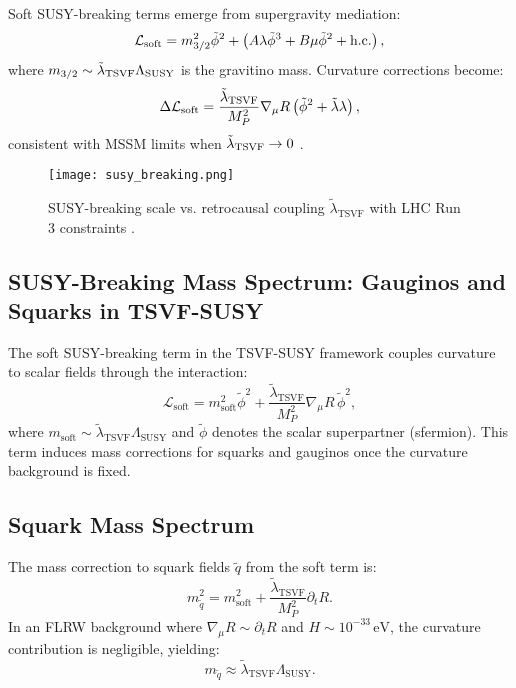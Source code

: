 \documentclass[twocolumn,superscriptaddress,floatfix]{revtex4-2}
\begin{document}
Soft SUSY-breaking terms emerge from supergravity mediation:
\begin{equation}
\mathcal{L}_{\rm soft} = m_{3/2}^2 \tilde{\phi}^2 + \left( A\lambda \tilde{\phi}^3 + B\mu \tilde{\phi}^2 + \text{h.c.} \right),
\label{eq:soft_breaking}
\end{equation}
where $m_{3/2} \sim \tilde{\lambda}_{\rm TSVF} \Lambda_{\rm SUSY}$ is the gravitino mass. Curvature corrections become:
\begin{equation}
\Delta\mathcal{L}_{\rm soft} = \frac{\tilde{\lambda}_{\rm TSVF}}{M_P^2} \nabla_\mu R \left( \tilde{\phi}^2 + \tilde{\lambda}\lambda \right),
\label{eq:curvature_correction}
\end{equation}
consistent with MSSM limits when $\tilde{\lambda}_{\rm TSVF} \to 0$ \cite{Martin:1997, Nilles:1984}.

\begin{figure}[htbp]
\centering
\texttt{[image: susy\_breaking.png]}
\caption{SUSY-breaking scale vs. retrocausal coupling $\tilde{\lambda}_{\text{TSVF}}$ with LHC Run 3 constraints \cite{CMS2023}.}
\label{fig:susy_breaking}
\end{figure}

\subsection{SUSY-Breaking Mass Spectrum: Gauginos and Squarks in TSVF-SUSY}
\label{subsec:susy_mass_spectrum}

The soft SUSY-breaking term in the TSVF-SUSY framework couples curvature to scalar fields through the interaction:
\begin{equation}
\mathcal{L}_{\text{soft}} = m_{\text{soft}}^2 \tilde{\phi}^2 + \frac{\tilde{\lambda}_{\text{TSVF}}}{M_P^2} \nabla_\mu R \, \tilde{\phi}^2,
\end{equation}
where $m_{\text{soft}} \sim \tilde{\lambda}_{\text{TSVF}} \Lambda_{\text{SUSY}}$ and $\tilde{\phi}$ denotes the scalar superpartner (sfermion). This term induces mass corrections for squarks and gauginos once the curvature background is fixed.

\subsection{Squark Mass Spectrum}
\label{subsec:squark_mass}

The mass correction to squark fields $\tilde{q}$ from the soft term is:
\begin{equation}
m_{\tilde{q}}^2 = m_{\text{soft}}^2 + \frac{\tilde{\lambda}_{\text{TSVF}}}{M_P^2} \partial_t R.
\end{equation}
In an FLRW background where $\nabla_\mu R \sim \partial_t R$ and $H \sim 10^{-33} \, \text{eV}$, the curvature contribution is negligible, yielding:
\begin{equation}
m_{\tilde{q}} \approx \tilde{\lambda}_{\text{TSVF}} \Lambda_{\text{SUSY}}.
\label{eq:squark_mass_corrected}
\end{equation}
\end{document}
